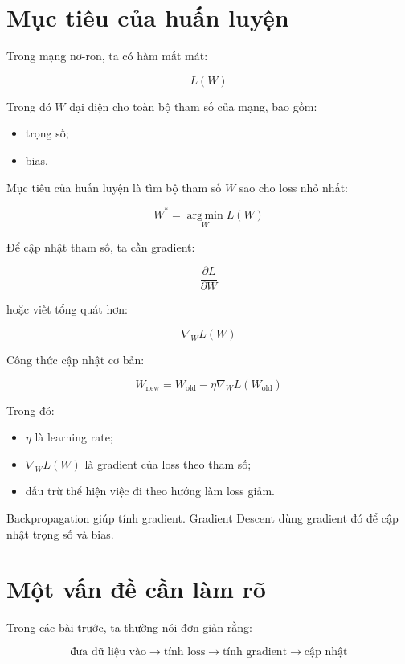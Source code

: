 \documentclass[12pt,a4paper]{report}
\begin{document}
\section{Mục tiêu của huấn luyện}

Trong mạng nơ-ron, ta có hàm mất mát:

\[
    L(W)
\]

Trong đó $W$ đại diện cho toàn bộ tham số của mạng, bao gồm:

\begin{itemize}
    \item trọng số;
    \item bias.
\end{itemize}

Mục tiêu của huấn luyện là tìm bộ tham số $W$ sao cho loss nhỏ nhất:

\[
    W^*=\operatorname*{arg\,min}_{W}L(W)
\]

Để cập nhật tham số, ta cần gradient:

\[
    \frac{\partial L}{\partial W}
\]

hoặc viết tổng quát hơn:

\[
    \nabla_W L(W)
\]

Công thức cập nhật cơ bản:

\[
    W_{\text{new}}
    =
    W_{\text{old}}
    -
    \eta \nabla_W L(W_{\text{old}})
\]

Trong đó:

\begin{itemize}
    \item $\eta$ là learning rate;
    \item $\nabla_W L(W)$ là gradient của loss theo tham số;
    \item dấu trừ thể hiện việc đi theo hướng làm loss giảm.
\end{itemize}

\begin{ghinho}
Backpropagation giúp tính gradient. Gradient Descent dùng gradient đó để cập nhật trọng số và bias.
\end{ghinho}

\section{Một vấn đề cần làm rõ}

Trong các bài trước, ta thường nói đơn giản rằng:

\[
    \text{đưa dữ liệu vào}
    \rightarrow
    \text{tính loss}
    \rightarrow
    \text{tính gradient}
    \rightarrow
    \text{cập nhật}
\]
\end{document}
